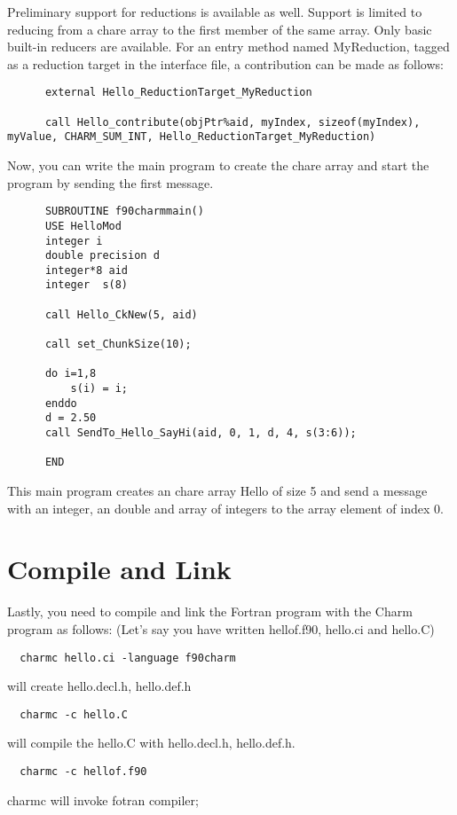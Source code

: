 \documentclass[11pt]{article}
\begin{document}
Preliminary support for reductions is available as well. Support is limited to
reducing from a chare array to the first member of the same array. Only basic
built-in reducers are available. For an entry method named MyReduction, tagged
as a reduction target in the interface file, a contribution can be made as
follows:

\begin{verbatim}
      external Hello_ReductionTarget_MyReduction

      call Hello_contribute(objPtr%aid, myIndex, sizeof(myIndex), myValue, CHARM_SUM_INT, Hello_ReductionTarget_MyReduction)
\end{verbatim}

Now, you can write the main program to create the chare array and start the 
program by sending the first message.
\begin{verbatim}
      SUBROUTINE f90charmmain()
      USE HelloMod
      integer i
      double precision d
      integer*8 aid
      integer  s(8)

      call Hello_CkNew(5, aid)

      call set_ChunkSize(10);

      do i=1,8
          s(i) = i;
      enddo
      d = 2.50
      call SendTo_Hello_SayHi(aid, 0, 1, d, 4, s(3:6));

      END
\end{verbatim}
This main program creates an chare array Hello of size 5 and send a message with
an integer, an double and array of integers to the array element of index 0.

\section{Compile and Link}
Lastly, you need to compile and link the Fortran program with the
Charm program as follows: (Let's say you have written hellof.f90, 
hello.ci and hello.C)
\begin{verbatim}
  charmc hello.ci -language f90charm
\end{verbatim}
    will create hello.decl.h, hello.def.h

\begin{verbatim}
  charmc -c hello.C
\end{verbatim}
    will compile the hello.C with hello.decl.h, hello.def.h.

\begin{verbatim}
  charmc -c hellof.f90
\end{verbatim}
    charmc will invoke fotran compiler;
\end{document}
